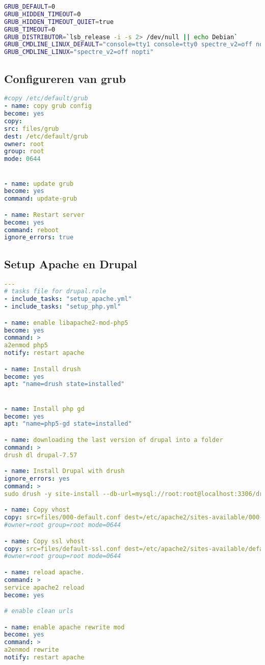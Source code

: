 \begin{lstlisting}[language=bash, basicstyle=\footnotesize]
GRUB_DEFAULT=0
GRUB_HIDDEN_TIMEOUT=0
GRUB_HIDDEN_TIMEOUT_QUIET=true
GRUB_TIMEOUT=0
GRUB_DISTRIBUTOR=`lsb_release -i -s 2> /dev/null || echo Debian`
GRUB_CMDLINE_LINUX_DEFAULT="console=tty1 console=tty0 spectre_v2=off nopti"
GRUB_CMDLINE_LINUX="spectre_v2=off nopti"

\end{lstlisting}

\subsection{Configureren van grub}
\begin{lstlisting}[language=yaml]
#copy /etc/default/grub
- name: copy grub config
become: yes
copy:
src: files/grub
dest: /etc/default/grub
owner: root
group: root
mode: 0644


- name: update grub
become: yes
command: update-grub

- name: Restart server
become: yes
command: reboot
ignore_errors: true


\end{lstlisting}

\subsection{Setup Apache en Drupal}
\begin{lstlisting}[language=yaml, breaklines=true]
---
# tasks file for drupal.role
- include_tasks: "setup_apache.yml"
- include_tasks: "setup_php.yml"

- name: enable libapache2-mod-php5
become: yes
command: >
a2enmod php5
notify: restart apache

- name: Install drush
become: yes
apt: "name=drush state=installed"


- name: Install php gd
become: yes
apt: "name=php5-gd state=installed"

- name: downloading the last version of drupal into a folder
command: >
drush dl drupal-7.57

- name: Install Drupal with drush
ignore_errors: yes
command: >
sudo drush -y site-install --db-url=mysql://root:root@localhost:3306/drupaldb --root="/home/vagrant/drupal-7.57"

- name: Copy vhost
copy: src=files/000-default.conf dest=/etc/apache2/sites-available/000-default.conf
#owner=root group=root mode=0644

- name: Copy ssl vhost
copy: src=files/default-ssl.conf dest=/etc/apache2/sites-available/default-ssl.conf
#owner=root group=root mode=0644

- name: reload apache.
command: >
service apache2 reload
become: yes

# enable clean urls

- name: enable apache rewrite mod
become: yes
command: >
a2enmod rewrite
notify: restart apache

\end{lstlisting}

